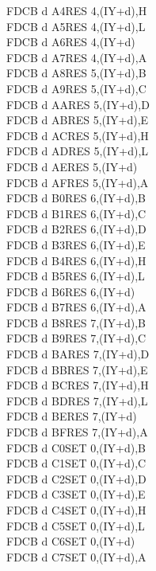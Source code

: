 \begin{multicols}{3}
{\begin{tabbing}
	FDCB d A4\>RES 4,(IY+d),H\UNDOC\\
	FDCB d A5\>RES 4,(IY+d),L\UNDOC\\
	FDCB d A6\>RES 4,(IY+d)\\
	FDCB d A7\>RES 4,(IY+d),A\UNDOC\\
	FDCB d A8\>RES 5,(IY+d),B\UNDOC\\
	FDCB d A9\>RES 5,(IY+d),C\UNDOC\\
	FDCB d AA\>RES 5,(IY+d),D\UNDOC\\
	FDCB d AB\>RES 5,(IY+d),E\UNDOC\\
	FDCB d AC\>RES 5,(IY+d),H\UNDOC\\
	FDCB d AD\>RES 5,(IY+d),L\UNDOC\\
	FDCB d AE\>RES 5,(IY+d)\\
	FDCB d AF\>RES 5,(IY+d),A\UNDOC\\
	FDCB d B0\>RES 6,(IY+d),B\UNDOC\\
	FDCB d B1\>RES 6,(IY+d),C\UNDOC\\
	FDCB d B2\>RES 6,(IY+d),D\UNDOC\\
	FDCB d B3\>RES 6,(IY+d),E\UNDOC\\
	FDCB d B4\>RES 6,(IY+d),H\UNDOC\\
	FDCB d B5\>RES 6,(IY+d),L\UNDOC\\
	FDCB d B6\>RES 6,(IY+d)\\
	FDCB d B7\>RES 6,(IY+d),A\UNDOC\\
	FDCB d B8\>RES 7,(IY+d),B\UNDOC\\
	FDCB d B9\>RES 7,(IY+d),C\UNDOC\\
	FDCB d BA\>RES 7,(IY+d),D\UNDOC\\
	FDCB d BB\>RES 7,(IY+d),E\UNDOC\\
	FDCB d BC\>RES 7,(IY+d),H\UNDOC\\
	FDCB d BD\>RES 7,(IY+d),L\UNDOC\\
	FDCB d BE\>RES 7,(IY+d)\\
	FDCB d BF\>RES 7,(IY+d),A\UNDOC\\
	FDCB d C0\>SET 0,(IY+d),B\UNDOC\\
	FDCB d C1\>SET 0,(IY+d),C\UNDOC\\
	FDCB d C2\>SET 0,(IY+d),D\UNDOC\\
	FDCB d C3\>SET 0,(IY+d),E\UNDOC\\
	FDCB d C4\>SET 0,(IY+d),H\UNDOC\\
	FDCB d C5\>SET 0,(IY+d),L\UNDOC\\
	FDCB d C6\>SET 0,(IY+d)\\
	FDCB d C7\>SET 0,(IY+d),A\UNDOC\\

\end{tabbing}}
\end{multicols}
